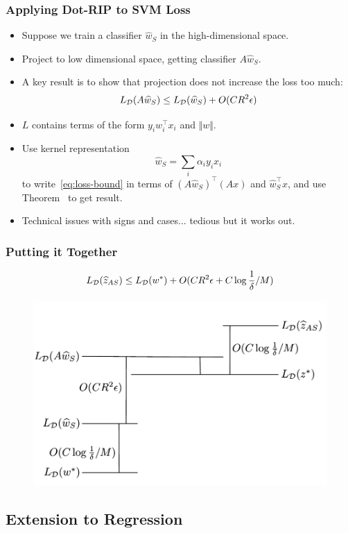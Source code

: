 \documentclass[aspectratio=34]{beamer}
\theoremstyle{plain}
\begin{document}
\begin{frame}
\frametitle{Applying Dot-RIP to SVM Loss}
\begin{itemize}
    \item Suppose we train a classifier $\widehat{w}_S$ in the high-dimensional space.
    \item Project to low dimensional space, getting classifier $A\widehat{w}_S$.
    \item A key result is to show that projection does not increase the loss too much:
        \[
            L_{\cal D}(A\widehat{w}_S) \leq L_{\cal D}(\widehat{w}_S) + O(CR^2\epsilon) \label{eq:loss-bound}
    \]
    \item $L$ contains terms of the form $y_iw_i^\top x_i$ and $\Vert w \Vert$.
    \item Use kernel representation $$\widehat{w}_S = \sum_i \alpha_i y_i x_i $$ to write~\eqref{eq:loss-bound} in terms of $(A\widehat{w}_S)^\top (Ax)$ and $\widehat{w}_S^\top x$, and use Theorem~\label{theorem:kernel} to get result.
    \item Technical issues with signs and cases... tedious but it works out.
\end{itemize}
\end{frame}

\begin{frame}
    \frametitle{Putting it Together}
    $$L_{\cal D}(\widehat{z}_{AS}) \leq L_{\cal D}(w^*) + O(CR^2\epsilon + C\log\frac{1}{\delta} / M)  $$
    \begin{figure}
        \includegraphics[width=\columnwidth]{bounds_argument_figure.pdf}
    \end{figure}
\end{frame}

\subsection{Extension to Regression}
\end{document}
